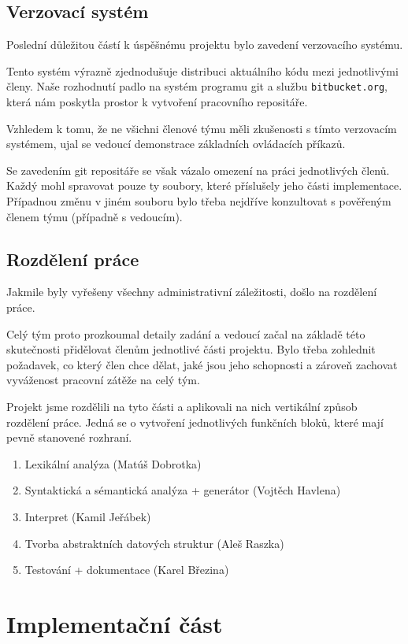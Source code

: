 \documentclass[12pt,a4paper]{article}
\begin{document}
\subsection{Verzovací systém}
Poslední důležitou částí k úspěšnému projektu bylo zavedení verzovacího systému. 

Tento systém výrazně zjednodušuje distribuci aktuálního kódu mezi jednotlivými členy. Naše rozhodnutí padlo na systém programu git a službu \texttt{bitbucket.org}, která nám poskytla prostor k vytvoření pracovního repositáře. 

Vzhledem k tomu, že ne všichni členové týmu měli zkušenosti s tímto verzovacím systémem, ujal se vedoucí demonstrace základních ovládacích příkazů.

Se zavedením git repositáře se však vázalo omezení na práci jednotlivých členů. 
Každý mohl spravovat pouze ty soubory, které příslušely jeho části implementace. Případnou změnu v jiném souboru bylo třeba nejdříve konzultovat s pověřeným členem týmu (případně s vedoucím).


\subsection{Rozdělení práce}
Jakmile byly vyřešeny všechny administrativní záležitosti, došlo na rozdělení práce. 

Celý tým proto prozkoumal detaily zadání a vedoucí začal na základě této skutečnosti přidělovat členům jednotlivé části projektu. Bylo třeba zohlednit požadavek, co který člen chce dělat, jaké jsou jeho schopnosti a zároveň zachovat vyváženost pracovní zátěže na celý tým. 

Projekt jsme rozdělili na tyto části a aplikovali na nich vertikální způsob rozdělení práce. Jedná se o vytvoření jednotlivých funkčních bloků, které mají pevně stanovené rozhraní. 
\begin{enumerate}
	\item Lexikální analýza (Matúš Dobrotka)
	\item Syntaktická a sémantická analýza + generátor (Vojtěch Havlena)
	\item Interpret (Kamil Jeřábek)
	\item Tvorba abstraktních datových struktur (Aleš Raszka)
	\item Testování + dokumentace (Karel Březina)
\end{enumerate}
\newpage
\section{Implementační část}
\end{document}
